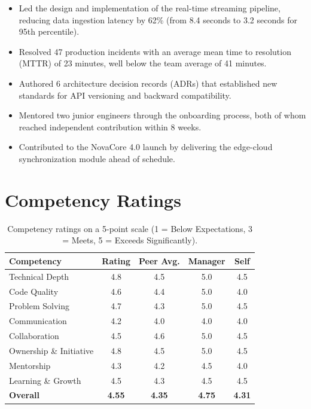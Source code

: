 \documentclass[
    language=english,
    doctype=performance-review,
    institution=none,
]{../../omnilatex}
\begin{document}
\begin{itemize}
    \item Led the design and implementation of the real-time streaming
          pipeline, reducing data ingestion latency by 62\% (from 8.4 seconds
          to 3.2 seconds for 95th percentile).
    \item Resolved 47 production incidents with an average mean time to
          resolution (MTTR) of 23 minutes, well below the team average of
          41 minutes.
    \item Authored 6 architecture decision records (ADRs) that established
          new standards for API versioning and backward compatibility.
    \item Mentored two junior engineers through the onboarding process, both
          of whom reached independent contribution within 8 weeks.
    \item Contributed to the NovaCore 4.0 launch by delivering the
          edge-cloud synchronization module ahead of schedule.
\end{itemize}

\section{Competency Ratings}

\begin{table}[h]
    \centering
    \begin{tabular}{lcccc}
        \toprule
        \textbf{Competency} & \textbf{Rating} & \textbf{Peer Avg.} & \textbf{Manager} & \textbf{Self} \\
        \midrule
        Technical Depth         & 4.8 & 4.5 & 5.0 & 4.5 \\
        Code Quality            & 4.6 & 4.4 & 5.0 & 4.0 \\
        Problem Solving         & 4.7 & 4.3 & 5.0 & 4.5 \\
        Communication           & 4.2 & 4.0 & 4.0 & 4.0 \\
        Collaboration           & 4.5 & 4.6 & 5.0 & 4.5 \\
        Ownership \& Initiative & 4.8 & 4.5 & 5.0 & 4.5 \\
        Mentorship              & 4.3 & 4.2 & 4.5 & 4.0 \\
        Learning \& Growth      & 4.5 & 4.3 & 4.5 & 4.5 \\
        \midrule
        \textbf{Overall}        & \textbf{4.55} & \textbf{4.35} & \textbf{4.75} & \textbf{4.31} \\
        \bottomrule
    \end{tabular}
    \caption{Competency ratings on a 5-point scale (1 = Below Expectations, 3 = Meets, 5 = Exceeds Significantly).}
\end{table}
\end{document}
